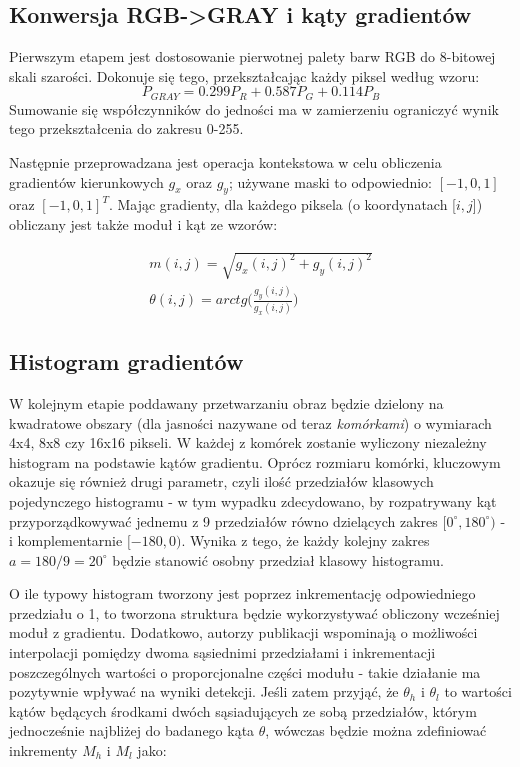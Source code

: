 \subsection{Konwersja RGB->GRAY i kąty gradientów}
\label{sec:HOGgrad}
Pierwszym etapem jest dostosowanie pierwotnej palety barw RGB do 8-bitowej skali szarości. Dokonuje się tego, przekształcając każdy piksel według wzoru:
\begin{equation}
\label{eq:rgb2gray}
P_{GRAY}=0.299P_R + 0.587P_G + 0.114P_B 
\end{equation}
Sumowanie się współczynników do jedności ma w zamierzeniu ograniczyć wynik tego przekształcenia do zakresu 0-255.

Następnie przeprowadzana jest operacja kontekstowa w celu obliczenia gradientów kierunkowych $g_x$ oraz $g_y$; używane maski to odpowiednio: $[-1,0,1]$ oraz $[-1,0,1]^T$. 
Mając gradienty, dla każdego piksela (o koordynatach [$i,j$]) obliczany jest także moduł i kąt ze wzorów:

\begin{equation}
\label{eq:HOGangles}
\left.\begin{aligned}
m(i,j)=\sqrt{g_x(i,j)^2+g_y(i,j)^2} \\
\theta(i,j)=arctg\bigg(\frac{g_y(i,j)}{g_x(i,j)}\bigg)
\end{aligned}\right.
\end{equation}

\subsection{Histogram gradientów}
W kolejnym etapie poddawany przetwarzaniu obraz będzie dzielony na kwadratowe obszary (dla jasności nazywane od teraz \textit{komórkami}) o wymiarach 4x4, 8x8 czy 16x16 pikseli. W każdej z komórek zostanie wyliczony niezależny histogram na podstawie kątów gradientu. Oprócz rozmiaru komórki, kluczowym okazuje się również drugi parametr, czyli ilość przedziałów klasowych pojedynczego histogramu - w tym wypadku zdecydowano, by rozpatrywany kąt przyporządkowywać jednemu z 9 przedziałów równo dzielących zakres $[0^{\circ},180^{\circ})$ - i komplementarnie $[-180,0)$. Wynika z tego, że każdy kolejny zakres $a=180/9=20^{\circ}$ będzie stanowić osobny przedział klasowy histogramu.

O ile typowy histogram tworzony jest poprzez inkrementację odpowiedniego przedziału o 1, to tworzona struktura będzie wykorzystywać obliczony wcześniej moduł z gradientu. Dodatkowo, autorzy publikacji wspominają o możliwości interpolacji pomiędzy dwoma sąsiednimi przedziałami i inkrementacji poszczególnych wartości o proporcjonalne części modułu - takie działanie ma pozytywnie wpływać na wyniki detekcji. Jeśli zatem przyjąć, że $\theta_h$ i $\theta_l$ to wartości kątów będących środkami dwóch sąsiadujących ze sobą przedziałów, którym jednocześnie najbliżej do badanego kąta $\theta$, wówczas będzie można zdefiniować inkrementy $M_h$ i $M_l$ jako:

